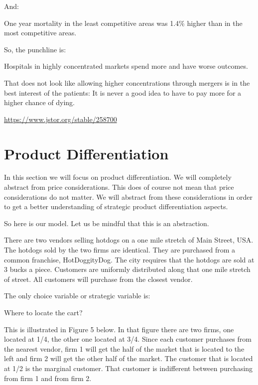 \documentclass[
]{book}
\begin{document}
And:

One year mortality in the least competitive areas was 1.4\% higher than in the most competitive areas.

So, the punchline is:

Hospitals in highly concentrated markets spend more and have worse outcomes.

That does not look like allowing higher concentrations through mergers is in the best interest of the patients: It is never a good idea to have to pay more for a higher chance of dying.

\url{https://www.jstor.org/stable/258700}

\hypertarget{product-differentiation}{%
\section{Product Differentiation}\label{product-differentiation}}

In this section we will focus on product differentiation. We will completely abstract from price considerations. This does of course not mean that price considerations do not matter. We will abstract from these considerations in order to get a better understanding of strategic product differentiation aspects.

So here is our model. Let us be mindful that this is an abstraction.

There are two vendors selling hotdogs on a one mile stretch of Main Street, USA. The hotdogs sold by the two firms are identical. They are purchased from a common franchise, HotDoggityDog. The city requires that the hotdogs are sold at 3 bucks a piece. Customers are uniformly distributed along that one mile stretch of street. All customers will purchase from the closest vendor.

The only choice variable or strategic variable is:

Where to locate the cart?

This is illustrated in Figure 5 below. In that figure there are two firms, one located at 1/4, the other one located at 3/4. Since each customer purchases from the nearest vendor, firm 1 will get the half of the market that is located to the left and firm 2 will get the other half of the market. The customer that is located at 1/2 is the marginal customer. That customer is indifferent between purchasing from firm 1 and from firm 2.
\end{document}
